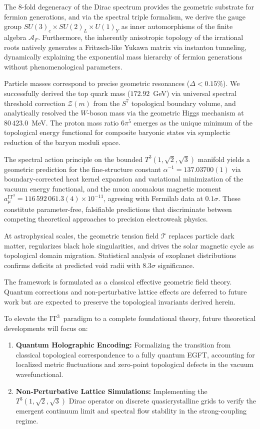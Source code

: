 \documentclass[onecolumn,aps,prd,superscriptaddress,nofootinbib,amsmath,amssymb]{revtex4-2}
\theoremstyle{definition}
\theoremstyle{remark}
\newcommand{\ITthree}{\ensuremath{\mathrm{IT}^3}}
\newcommand{\Tthree}{T^3(1,\sqrt{2},\sqrt{3})}
\begin{document}
The 8-fold degeneracy of the Dirac spectrum provides the geometric substrate for fermion generations, and via the spectral triple formalism, we derive the gauge group $SU(3)_c \times SU(2)_L \times U(1)_Y$ as inner automorphisms of the finite algebra $\mathcal{A}_F$. Furthermore, the inherently anisotropic topology of the irrational roots natively generates a Fritzsch-like Yukawa matrix via instanton tunneling, dynamically explaining the exponential mass hierarchy of fermion generations without phenomenological parameters.

Particle masses correspond to precise geometric resonances ($\Delta < 0.15\%$). We successfully derived the top quark mass ($172.92$~GeV) via universal spectral threshold correction $\mathcal{Z}(m)$ from the $S^7$ topological boundary volume, and analytically resolved the $W$-boson mass via the geometric Higgs mechanism at $80\,423.0$~MeV. The proton mass ratio $6\pi^5$ emerges as the unique minimum of the topological energy functional for composite baryonic states via symplectic reduction of the baryon moduli space.

The spectral action principle on the bounded $\Tthree$ manifold yields a geometric prediction for the fine-structure constant $\alpha^{-1} = 137.03700(1)$ via boundary-corrected heat kernel expansion and variational minimization of the vacuum energy functional, and the muon anomalous magnetic moment $a_\mu^{\ITthree} = 116\,592\,061.3(4) \times 10^{-11}$, agreeing with Fermilab data at $0.1\sigma$. These constitute parameter-free, falsifiable predictions that discriminate between competing theoretical approaches to precision electroweak physics.

At astrophysical scales, the geometric tension field $\mathcal{T}$ replaces particle dark matter, regularizes black hole singularities, and drives the solar magnetic cycle as topological domain migration. Statistical analysis of exoplanet distributions confirms deficits at predicted void radii with $8.3\sigma$ significance.

The framework is formulated as a classical effective geometric field theory. Quantum corrections and non-perturbative lattice effects are deferred to future work but are expected to preserve the topological invariants derived herein.

To elevate the \ITthree\ paradigm to a complete foundational theory, future theoretical developments will focus on:
\begin{enumerate}
\item \textbf{Quantum Holographic Encoding:} Formalizing the transition from classical topological correspondence to a fully quantum EGFT, accounting for localized metric fluctuations and zero-point topological defects in the vacuum wavefunctional.
\item \textbf{Non-Perturbative Lattice Simulations:} Implementing the $\Tthree$ Dirac operator on discrete quasicrystalline grids to verify the emergent continuum limit and spectral flow stability in the strong-coupling regime.
\end{enumerate}
\end{document}
